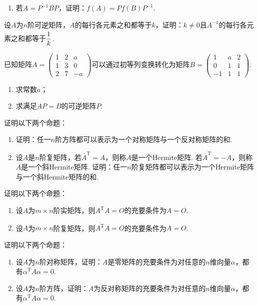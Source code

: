 \begin{exercise}
\begin{exgroup}
\begin{enumerate}
            \item 若$A=P^{-1}BP$，证明：$f(A)=Pf(B)P^{-1}$.
        \end{enumerate}

        \item 设$A$为$n$阶可逆矩阵，$A$的每行各元素之和都等于$k$，证明：$k \neq 0$且$A^{-1}$的每行各元素之和都等于$\vphantom{\cfrac{1}{k}}\dfrac{1}{k}$.

        \item 已知矩阵$A=\begin{pmatrix}1 & 2 & a  \\
               1 & 3 & 0  \\
               2 & 7 & -a\end{pmatrix}$可以通过初等列变换转化为矩阵$B=\begin{pmatrix}1  & a & 2 \\
               0  & 1 & 1 \\
               -1 & 1 & 1\end{pmatrix}$.
        \begin{enumerate}
            \item 求常数$a$；

            \item 求满足$AP=B$的可逆矩阵$P$.
        \end{enumerate}

        \item 证明以下两个命题：
        \begin{enumerate}
            \item 证明：任一$n$阶方阵都可以表示为一个对称矩阵与一个反对称矩阵的和.
            \item 设$A$是$n$阶复矩阵，若$\overline{A}^\mathrm{T}=A$，则称$A$是一个Hermite矩阵. 若$\overline{A}^\mathrm{T}=-A$，则称$A$是一个斜Hermite矩阵. 证明：任一$n$阶复矩阵都可以表示为一个Hermite矩阵与一个斜Hermite矩阵的和.
        \end{enumerate}

        \item 证明以下两个命题：
        \begin{enumerate}
            \item 设$A$为$m\times n$阶实矩阵，则$A^\mathrm{T}A=O$的充要条件为$A=O$.
            \item 设$A$为$m\times n$阶复矩阵，则$\overline{A^\mathrm{T}}A=O$的充要条件为$A=O$.
        \end{enumerate}

        \item 证明以下两个命题：
        \begin{enumerate}
            \item 设$A$为$n$阶对称矩阵，证明：$A$是零矩阵的充要条件为对任意的$n$维向量$\alpha$，都有$\alpha^\mathrm{T}A\alpha=0$.
            \item 设$A$为$n$阶方阵，证明：$A$为反对称矩阵的充要条件为对任意的$n$维向量$\alpha$，都有$\alpha^\mathrm{T}A\alpha=0$.
        \end{enumerate}


\end{exgroup}
\end{exercise}
